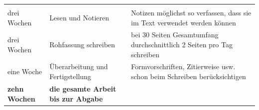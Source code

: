 \documentclass[]{book}
\theoremstyle{definition}
\theoremstyle{definition}
\theoremstyle{definition}
\theoremstyle{remark}
\begin{document}
\begin{longtable}[]{@{}lll@{}}
\begin{minipage}[t]{0.37\columnwidth}
\end{minipage}\tabularnewline
\begin{minipage}[t]{0.14\columnwidth}\raggedright\strut
drei Wochen\strut
\end{minipage} & \begin{minipage}[t]{0.40\columnwidth}\raggedright\strut
Lesen und Notieren\strut
\end{minipage} & \begin{minipage}[t]{0.37\columnwidth}\raggedright\strut
Notizen möglichst so verfassen, dass sie im Text verwendet werden
können\vspace{5mm}\strut
\end{minipage}\tabularnewline
\begin{minipage}[t]{0.14\columnwidth}\raggedright\strut
drei Wochen\strut
\end{minipage} & \begin{minipage}[t]{0.40\columnwidth}\raggedright\strut
Rohfassung schreiben\strut
\end{minipage} & \begin{minipage}[t]{0.37\columnwidth}\raggedright\strut
bei 30 Seiten Gesamtumfang durchschnittlich 2 Seiten pro Tag
schreiben\vspace{5mm}\strut
\end{minipage}\tabularnewline
\begin{minipage}[t]{0.14\columnwidth}\raggedright\strut
eine Woche\strut
\end{minipage} & \begin{minipage}[t]{0.40\columnwidth}\raggedright\strut
Überarbeitung und Fertigstellung\strut
\end{minipage} & \begin{minipage}[t]{0.37\columnwidth}\raggedright\strut
Formvorschriften, Zitierweise usw. schon beim Schreiben
berücksichtigen\vspace{5mm}\strut
\end{minipage}\tabularnewline
\begin{minipage}[t]{0.14\columnwidth}\raggedright\strut
\textbf{zehn Wochen}\strut
\end{minipage} & \begin{minipage}[t]{0.40\columnwidth}\raggedright\strut
\textbf{die gesamte Arbeit bis zur Abgabe}\strut
\end{minipage} & \begin{minipage}[t]{0.37\columnwidth}\raggedright\strut
\strut
\end{minipage}\tabularnewline
\bottomrule
\end{longtable}
\end{document}
